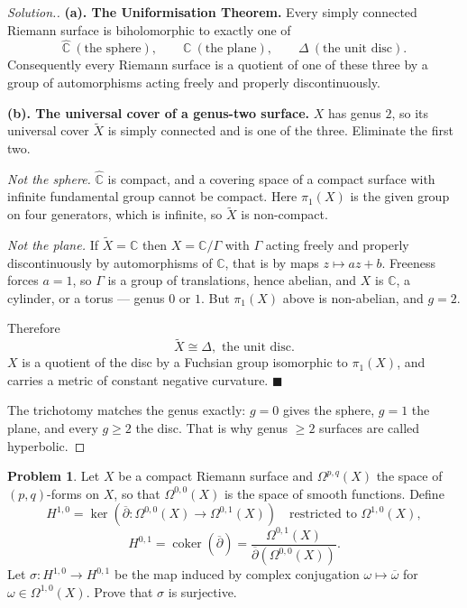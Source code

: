 \documentclass[11pt,a4paper]{article}
\theoremstyle{definition}
\newtheorem{problemx}{Problem}[section]
\newenvironment{problem}{\begin{problemx}}{\end{problemx}}
\newenvironment{solution}
  {\renewcommand{\qedsymbol}{}\begin{proof}[\textit{Solution}.]}
  {\end{proof}}
\begin{document}
\begin{solution}
\textbf{(a). The Uniformisation Theorem.} Every simply connected Riemann surface is
biholomorphic to exactly one of
$$\widehat{\mathbb{C}} \ (\text{the sphere}),\qquad
\mathbb{C} \ (\text{the plane}),\qquad
\Delta \ (\text{the unit disc}).$$
Consequently every Riemann surface is a quotient of one of these three by a group
of automorphisms acting freely and properly discontinuously.

\textbf{(b). The universal cover of a genus-two surface.} $X$ has genus $2$, so its
universal cover $\widetilde{X}$ is simply connected and is one of the three.
Eliminate the first two.

\emph{Not the sphere.} $\widehat{\mathbb{C}}$ is compact, and a covering space of a
compact surface with infinite fundamental group cannot be compact. Here
$\pi_1(X)$ is the given group on four generators, which is infinite, so
$\widetilde{X}$ is non-compact.

\emph{Not the plane.} If $\widetilde{X} = \mathbb{C}$ then $X = \mathbb{C}/\Gamma$
with $\Gamma$ acting freely and properly discontinuously by automorphisms of
$\mathbb{C}$, that is by maps $z \mapsto az+b$. Freeness forces $a = 1$, so
$\Gamma$ is a group of translations, hence abelian, and $X$ is $\mathbb{C}$, a
cylinder, or a torus --- genus $0$ or $1$. But $\pi_1(X)$ above is non-abelian, and
$g = 2$.

Therefore
$$\boxed{\widetilde{X} \cong \Delta, \text{ the unit disc.}}$$
$X$ is a quotient of the disc by a Fuchsian group isomorphic to $\pi_1(X)$, and
carries a metric of constant negative curvature. $\blacksquare$

The trichotomy matches the genus exactly: $g = 0$ gives the sphere, $g = 1$ the
plane, and every $g \geq 2$ the disc. That is why genus $\geq 2$ surfaces are
called hyperbolic.
\end{solution}


\begin{problem}
Let $X$ be a compact Riemann surface and $\Omega^{p,q}(X)$ the space of
$(p,q)$-forms on $X$, so that $\Omega^{0,0}(X)$ is the space of smooth
functions. Define
$$H^{1,0} = \ker\left(\overline{\partial} : \Omega^{0,0}(X) \rightarrow \Omega^{0,1}(X)\right)
\quad \text{restricted to } \Omega^{1,0}(X),$$
$$H^{0,1} = \operatorname{coker}\left(\overline{\partial}\right)
= \frac{\Omega^{0,1}(X)}{\overline{\partial}\left(\Omega^{0,0}(X)\right)} .$$
Let $\sigma : H^{1,0} \rightarrow H^{0,1}$ be the map induced by complex
conjugation $\omega \mapsto \overline{\omega}$ for
$\omega \in \Omega^{1,0}(X)$. Prove that $\sigma$ is surjective.
\end{problem}
\end{document}
